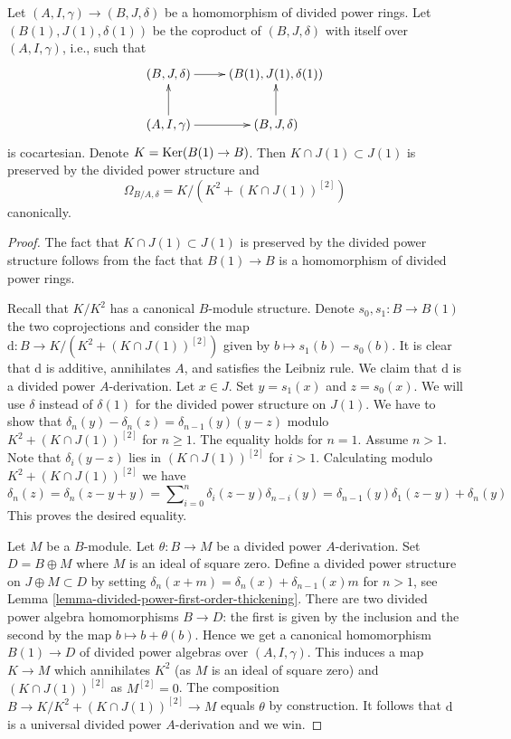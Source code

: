 \begin{lemma}
\label{lemma-diagonal-and-differentials}
Let $(A, I, \gamma) \to (B, J, \delta)$ be a homomorphism
of divided power rings. Let $(B(1), J(1), \delta(1))$ be the coproduct
of $(B, J, \delta)$ with itself over $(A, I, \gamma)$, i.e.,
such that
$$
\xymatrix{
(B, J, \delta) \ar[r] & (B(1), J(1), \delta(1)) \\
(A, I, \gamma) \ar[r] \ar[u] & (B, J, \delta) \ar[u]
}
$$
is cocartesian. Denote $K = \mathop{\mathrm{Ker}}(B(1) \to B)$.
Then $K \cap J(1) \subset J(1)$ is preserved by the divided power
structure and
$$
\Omega_{B/A, \delta} = K/ \left(K^2 + (K \cap J(1))^{[2]}\right)
$$
canonically.
\end{lemma}

\begin{proof}
The fact that $K \cap J(1) \subset J(1)$ is preserved by the divided power
structure follows from the fact that $B(1) \to B$ is a homomorphism of
divided power rings.

\medskip\noindent
Recall that $K/K^2$ has a canonical $B$-module structure.
Denote $s_0, s_1 : B \to B(1)$ the two coprojections and consider
the map $\text{d} : B \to K/(K^2 +(K \cap J(1))^{[2]})$ given by
$b \mapsto s_1(b) - s_0(b)$. It is clear that $\text{d}$ is additive,
annihilates $A$, and satisfies the Leibniz rule.
We claim that $\text{d}$ is a divided power $A$-derivation.
Let $x \in J$. Set $y = s_1(x)$ and $z = s_0(x)$.
We will use $\delta$ instead of $\delta(1)$ for
the divided power structure on $J(1)$.
We have to show that $\delta_n(y) - \delta_n(z) = \delta_{n - 1}(y)(y - z)$
modulo $K^2 +(K \cap J(1))^{[2]}$ for $n \geq 1$.
The equality holds for $n = 1$. Assume $n > 1$.
Note that $\delta_i(y - z)$ lies in $(K \cap J(1))^{[2]}$ for $i > 1$.
Calculating modulo $K^2 + (K \cap J(1))^{[2]}$ we have
$$
\delta_n(z) = \delta_n(z - y + y) =
\sum\nolimits_{i = 0}^n \delta_i(z - y)\delta_{n - i}(y) =
\delta_{n - 1}(y) \delta_1(z - y) + \delta_n(y)
$$
This proves the desired equality.

\medskip\noindent
Let $M$ be a $B$-module. Let $\theta : B \to M$ be a divided power
$A$-derivation.
Set $D = B \oplus M$ where $M$ is an ideal of square zero. Define a
divided power structure on $J \oplus M \subset D$ by setting
$\delta_n(x + m) = \delta_n(x) + \delta_{n - 1}(x)m$ for $n > 1$, see
Lemma \ref{lemma-divided-power-first-order-thickening}.
There are two divided power algebra homomorphisms $B \to D$: the first
is given by the inclusion and the second by the map $b \mapsto b + \theta(b)$.
Hence we get a canonical homomorphism $B(1) \to D$ of divided power
algebras over $(A, I, \gamma)$. This induces a map $K \to M$
which annihilates $K^2$ (as $M$ is an ideal of square zero) and
$(K \cap J(1))^{[2]}$ as $M^{[2]} = 0$. The composition
$B \to K/K^2 + (K \cap J(1))^{[2]} \to M$ equals $\theta$ by construction.
It follows that $\text{d}$
is a universal divided power $A$-derivation and we win.
\end{proof}

